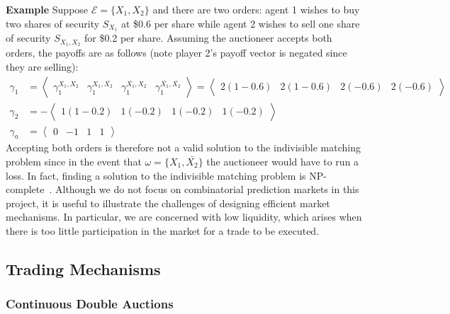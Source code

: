 \textbf{Example} Suppose $\mathcal{E} = \{X_1, X_2\}$ and there are two orders:
agent 1 wishes to buy two shares of security $S_{X_1}$ at \$0.6 per share while
agent 2 wishes to sell one share of security $S_{X_1,X_2}$ for \$0.2 per
share. Assuming the auctioneer accepts both orders, the payoffs are as follows
(note player 2's payoff vector is negated since they are selling):
%
\begin{equation*}
	\begin{aligned}
		\gamma_1 & = \left\langle \begin{matrix}
			\gamma_1^{X_1,X_2} &
			\gamma_1^{X_1,\bar{X_2}} &
			\gamma_1^{\bar{X_1},X_2} &
		\gamma_1^{\bar{X_1},\bar{X_2}} \end{matrix} \right\rangle 
%
		 = \left\langle \begin{matrix}
			2(1-0.6) & 2(1-0.6) & 2(-0.6) & 2(-0.6) \end{matrix} \right\rangle \\
%
		\gamma_2 & = - \left\langle \begin{matrix}
			1(1-0.2) & 1(-0.2) & 1(-0.2) & 1(-0.2) \end{matrix} \right\rangle \\
%
		\gamma_a & = \left\langle \begin{matrix}
			0 & -1 & 1 & 1 \end{matrix} \right\rangle
	\end{aligned}
\end{equation*}
%
Accepting both orders is therefore not a valid solution to the indivisible
matching problem since in the event that $\omega = \{X_1,\bar{X_2}\}$ the
auctioneer would have to run a loss. In fact, finding a solution to the
indivisible matching problem is NP-complete~\cite[Ch.~26]{AGTBook}. Although we
do not focus on combinatorial prediction markets in this project, it is useful
to illustrate the challenges of designing efficient market mechanisms. In
particular, we are concerned with low liquidity, which arises when there is too
little participation in the market for a trade to be executed.

\subsection{Trading Mechanisms}

\label{sec:tradingMechanisms}

\subsubsection{Continuous Double Auctions}

